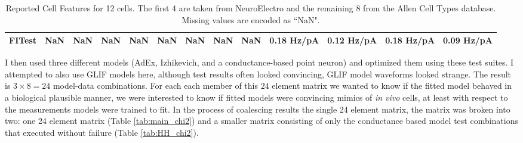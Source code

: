 \begin{table}
{\begin{tabular}{lllllllllllll}
FITest                         &                            NaN &                      NaN &                                NaN &          NaN &            NaN &            NaN &            NaN &            NaN &  0.18 Hz/pA &  0.12 Hz/pA &  0.18 Hz/pA &  0.09 Hz/pA \\
\bottomrule
\end{tabular}}
\caption[Reported Cell Features]{Reported Cell Features for 12 cells.
The first 4 are taken from NeuroElectro and the remaining 8 from the Allen Cell Types database.
Missing values are encoded as ``NaN".}
\label{table:tests_derived_from_reports}
\end{table}

I then used three different models (AdEx, Izhikevich, and a conductance-based point neuron) and optimized them using these test suites. I attempted to also use GLIF models here, although test results often looked convincing, GLIF model waveforms looked strange.
The result is $3 \times 8 = 24$ model-data combinations.
For each each member of this $24$ element matrix we wanted to know if the fitted model behaved in a biological plausible manner, we were interested to know if fitted models were convincing mimics of \emph{in vivo} cells, at least with respect to the measurements models were trained to fit.
In the process of coalescing results the single 24 element matrix, the matrix was broken into two: one 24 element matrix (Table \ref{tab:main_chi2})
and a smaller matrix consisting of only the conductance based model test combinations that executed without failure (Table \ref{tab:HH_chi2}).

